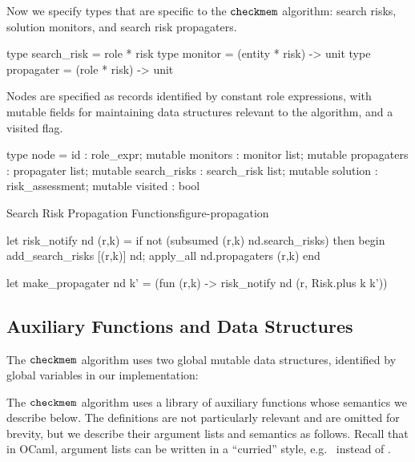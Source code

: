 Now we specify types that are specific to the $\texttt{checkmem}$ 
algorithm: search risks, solution monitors, and search risk
propagaters.  
\begin{verbatimtab}
type search_risk = role * risk
type monitor = (entity * risk) -> unit 
type propagater = (role * risk) -> unit
\end{verbatimtab}
Nodes are specified as records identified by constant role
expressions, with mutable fields for maintaining data structures
relevant to the algorithm, and a visited flag.
\begin{verbatimtab}
type node = { 
    id : role_expr;  
    mutable monitors : monitor list; 
    mutable propagaters : propagater list; 
    mutable search_risks : search_risk list;
    mutable solution : risk_assessment;
    mutable visited : bool
  }
\end{verbatimtab}

\begin{fpfig*}[t]{Search Risk Propagation Functions}{figure-propagation}
\footnotesize
\medskip
\begin{verbatimtab}
  let risk_notify nd (r,k) = 
    if not (subsumed (r,k) nd.search_risks) 
    then 
      begin
        add_search_risks [(r,k)] nd;
        apply_all nd.propagaters (r,k)
      end

  let make_propagater nd k' = (fun (r,k) -> risk_notify nd (r, Risk.plus k k')) 
\end{verbatimtab}
\smallskip
\end{fpfig*}

\subsection{Auxiliary Functions and Data Structures}
\label{appendix-checkmem-auxfns}

The $\texttt{checkmem}$ algorithm uses two global mutable data structures, 
identified by global variables in our implementation:

\medskip



\smallskip



The $\texttt{checkmem}$ algorithm uses a library of auxiliary functions
whose semantics we describe below.  The definitions are not 
particularly relevant and are omitted for brevity, but we 
describe their argument lists and semantics as follows.   
Recall that in OCaml, argument lists can be written in a
``curried'' style, e.g.~ instead of .

